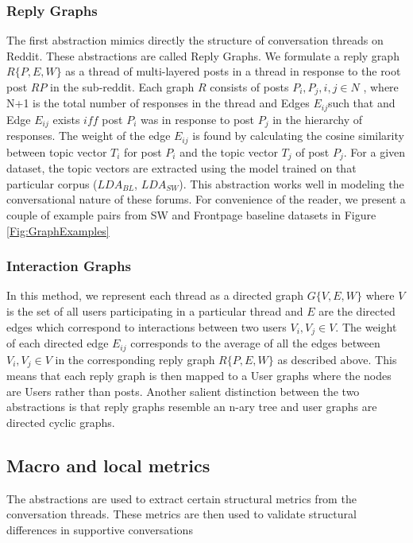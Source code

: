 \subsubsection{Reply Graphs}
\label{Sec:Reply_graphs}
The first abstraction mimics directly the structure of conversation threads on Reddit. These abstractions are called Reply Graphs. We formulate a reply graph $R\{P,E,W\}$ as a thread of multi-layered posts in a thread in response to the root post $RP$ in the sub-reddit. Each graph $R$ consists of posts $P_i , P_j , i,j \in N$ , where N+1 is the total number of responses in the thread and Edges $E_{ij}$such that and Edge $E_{ij}$ exists $iff$ post $P_i$ was in response to post $P_j$ in the hierarchy of responses.  The weight of the edge $E_{ij}$ is found by calculating the cosine similarity between topic vector $T_i$ for post $P_i$ and the topic vector $T_j$ of post $P_j$. For a given dataset, the topic vectors are extracted using the model trained on that particular corpus ($LDA_{BL}$, $LDA_{SW}$).  This abstraction works well in modeling the conversational nature of these forums.  For convenience of the reader, we present a couple of example pairs from SW and Frontpage baseline datasets in Figure \ref{Fig:GraphExamples}

\subsubsection{Interaction Graphs}
\label{Sec:Interaction_graphs}
In this method, we represent each thread as a directed graph $G\{V,E,W\}$ where $V$ is the set of all users participating in a particular thread and $E$ are the directed  edges which correspond to interactions between two users $V_i , V_j  \in V$. The weight of each directed edge $E_{ij}$ corresponds to the average of all the edges between $V_i , V_j  \in V$ in the corresponding reply graph $R\{P,E,W\}$ as described above. This means that each reply graph is then mapped to a User graphs where the nodes are Users rather than posts. Another salient distinction between the two abstractions is that reply graphs resemble an n-ary tree and user graphs are directed cyclic graphs. 





\subsection{Macro and local metrics}
The abstractions are used to extract certain structural metrics from the conversation threads. These metrics are then used to validate structural differences in supportive conversations 



